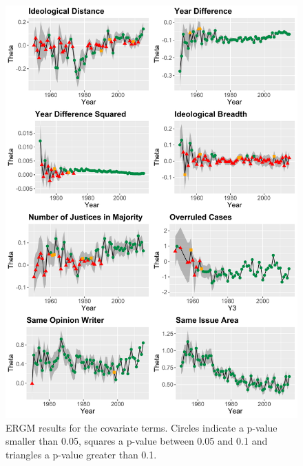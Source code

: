 \documentclass{cup-pan}
\begin{document}
\begin{figure}
\centering
\includegraphics[width=14cm ]{SCC_results_2.pdf}
\caption{ERGM results for the covariate terms. Circles indicate a p-value smaller than 0.05, squares a p-value between 0.05 and 0.1 and triangles a p-value greater than 0.1.}
 \label{SCC_results_2}
\end{figure}

\end{document}
